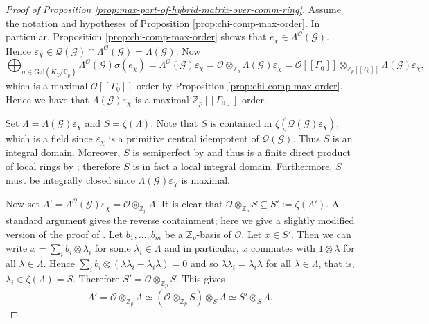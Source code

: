\documentclass[12pt]{amsart}
\theoremstyle{plain}
\theoremstyle{remark}
\theoremstyle{definition}
\numberwithin{equation}{section}
\begin{document}
\begin{proof}[Proof of Proposition \ref{prop:max-part-of-hybrid-matrix-over-comm-ring}]
Assume the notation and hypotheses of Proposition \ref{prop:chi-comp-max-order}.
In particular, Proposition \ref{prop:chi-comp-max-order} shows that $e_{\chi} \in \Lambda^{\mathcal{O}}(\mathcal{G})$.
Hence $\varepsilon_{\chi} \in \mathcal{Q}(\mathcal{G}) \cap \Lambda^{\mathcal{O}}(\mathcal{G}) = \Lambda(\mathcal{G})$.
Now
\[
 \bigoplus_{\sigma \in {\mathrm{Gal}}(K_{\chi}/{\mathbb{Q}}_{p})} \Lambda^{\mathcal{O}}(\mathcal{G})\sigma(e_{\chi})
= \Lambda^{\mathcal{O}}(\mathcal{G}) \varepsilon_{\chi}
= \mathcal{O} \otimes_{{\mathbb{Z}}_{p}} \Lambda(\mathcal{G})  \varepsilon_{\chi}
=\mathcal{O}[[\Gamma_{0}]] \otimes_{{\mathbb{Z}}_{p}[[\Gamma_{0}]]} \Lambda(\mathcal{G}) \varepsilon_{\chi},
\]
which is a maximal $\mathcal{O}[[\Gamma_{0}]]$-order by Proposition \ref{prop:chi-comp-max-order}.
Hence we have that $\Lambda(\mathcal{G}) \varepsilon_{\chi}$ is a maximal ${\mathbb{Z}}_{p}[[\Gamma_{0}]]$-order.

Set $\Lambda = \Lambda(\mathcal{G})\varepsilon_{\chi}$ and $S=\zeta(\Lambda)$.
Note that $S$ is contained in $\zeta(\mathcal{Q}(\mathcal{G})\varepsilon_{\chi})$, which is a field
since $\varepsilon_{\chi}$ is a primitive central idempotent of $\mathcal{Q}(\mathcal{G})$.
Thus $S$ is an integral domain.
Moreover, $S$ is semiperfect by \cite[Example (23.3)]{MR1838439} and thus is a finite direct product of local rings by
\cite[Theorem (23.11)]{MR1838439}; therefore $S$ is in fact a local integral domain.
Furthermore,
$S$ must be integrally closed since $\Lambda(\mathcal{G})\varepsilon_{\chi}$ is maximal.

Now set $\Lambda' = \Lambda^{\mathcal{O}}(\mathcal{G})\varepsilon_{\chi} = \mathcal{O} \otimes_{{\mathbb{Z}}_{p}} \Lambda$.
It is clear that $\mathcal{O} \otimes_{{\mathbb{Z}}_{p}} S \subseteq S':=\zeta(\Lambda')$.
A standard argument gives the reverse containment; here we give a slightly modified version of the proof of
\cite[Theorem 7.6]{MR1972204}.
Let $b_{1}, \ldots, b_{m}$ be a ${\mathbb{Z}}_{p}$-basis of $\mathcal{O}$. Let $x \in S'$.
Then we can write $x= \sum_{i} b_{i} \otimes \lambda_{i}$ for some $\lambda_{i} \in \Lambda$
and in particular, $x$ commutes with $1 \otimes \lambda$ for all $\lambda \in \Lambda$.
Hence $\sum_{i} b_{i} \otimes (\lambda \lambda_{i} - \lambda_{i} \lambda) = 0$
and so $\lambda \lambda_{i} = \lambda_{i} \lambda$ for all $\lambda \in \Lambda$,
that is, $\lambda_{i} \in \zeta(\Lambda)=S$.
Therefore $S' = \mathcal{O} \otimes_{{\mathbb{Z}}_{p}} S$. This gives
\begin{equation}\label{eqn:extend-by-central-scalars}
\Lambda'  = \mathcal{O} \otimes_{{\mathbb{Z}}_{p}} \Lambda \simeq (\mathcal{O} \otimes_{{\mathbb{Z}}_{p}} S) \otimes_{S} \Lambda \simeq S' \otimes_{S} \Lambda.
\end{equation}


\end{proof}
\end{document}
